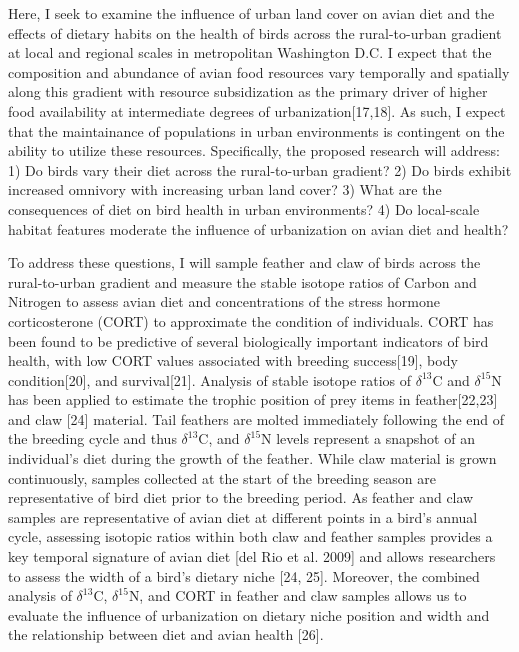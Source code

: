 \documentclass[12pt]{article}
\begin{document}

 Here, I seek to examine the influence of urban land cover on avian diet and the effects of dietary habits on the health of birds across the rural-to-urban gradient at local and regional scales in metropolitan Washington D.C. I expect that the composition and abundance of avian food resources vary temporally and spatially along this gradient with resource subsidization as the primary driver of higher food availability at intermediate degrees of urbanization[17,18]. As such, I expect that the maintainance of populations in urban environments is contingent on the ability to utilize these resources. Specifically, the proposed research will address:  1) Do birds vary their diet across the rural-to-urban gradient? 2) Do birds exhibit increased omnivory with increasing urban land cover? 3) What are the consequences of diet on bird health in  urban environments? 4) Do local-scale habitat features moderate the influence of urbanization on avian diet and health? \par

To address these questions, I will sample feather and claw of birds across the rural-to-urban gradient and measure the stable isotope ratios of Carbon and Nitrogen to assess avian diet and concentrations of the stress hormone corticosterone (CORT) to approximate the condition of individuals. CORT has been found to be predictive of several biologically important indicators of bird health, with low CORT values associated with breeding success[19], body condition[20], and survival[21]. Analysis of stable isotope ratios of $\delta^{13}$C and $\delta^{15}$N has been applied to estimate the trophic position of prey items in feather[22,23] and claw [24] material. Tail feathers are molted immediately following the end of the breeding cycle and thus $\delta^{13}$C, and $\delta^{15}$N levels represent a snapshot of an individual's diet during the growth of the feather. While claw material is grown continuously, samples collected at the start of the breeding season are representative of bird diet prior to the breeding period. As feather and claw samples are representative of avian diet at different points in a bird's annual cycle, assessing isotopic ratios within both claw and feather samples provides a key temporal signature of avian diet [del Rio et al. 2009] and allows researchers to assess the width of a bird's dietary niche [24, 25]. Moreover, the combined analysis of $\delta^{13}$C, $\delta^{15}$N, and CORT in feather and claw samples allows us to evaluate the influence of urbanization on dietary niche position and width and the relationship between diet and avian health [26].\par
\end{document}
